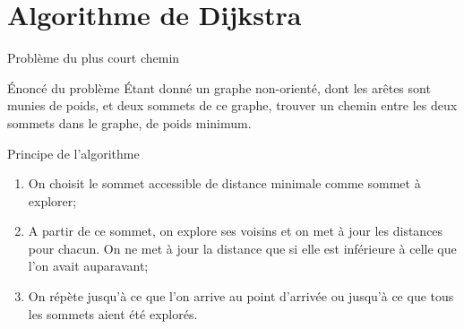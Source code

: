 \documentclass[10pt,xcolor=dvipsnames]{beamer}
\begin{document}
\section{Algorithme de Dijkstra}

\begin{frame}{Problème du plus court chemin}
    \begin{exampleblock}{Énoncé du problème}
    Étant donné un graphe non-orienté, dont les arêtes sont munies de poids, et deux sommets de ce graphe, trouver un chemin entre les deux sommets dans le graphe, de poids minimum.
    \end{exampleblock}
    \begin{alertblock}{Principe de l'algorithme}
    \begin{enumerate}
        \item On choisit le sommet accessible de distance minimale comme sommet à explorer;
        \item A partir de ce sommet, on explore ses voisins et on met à jour les distances pour chacun. On ne met à jour la distance que si elle est inférieure à celle que l’on avait auparavant;
        \item On répète jusqu’à ce que l’on arrive au point d’arrivée ou jusqu’à ce que tous les sommets aient été explorés.
    \end{enumerate}
    \end{alertblock}
\end{frame}
\end{document}
